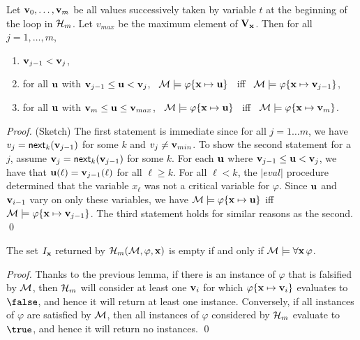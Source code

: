 \documentclass{svjour3}                     %
\begin{document}
\begin{lem}
Let $\mathbf{v}_0, \ldots, \mathbf{v}_m$ be all values successively taken
by variable $t$ at the beginning of the loop in $\mathcal{H}_{m}$.
Let $v_{max}$ be the maximum element of $\mathbf{V}_{\mathbf{x}}$.
Then for all $j=1, \ldots, m$,
\begin{enumerate}
\item
$\mathbf{v}_{j-1} < \mathbf{v}_j$,
\item
for all $\mathbf{u}$ with $\mathbf{v}_{j-1} \leq \mathbf{u} < \mathbf{v}_j$, \ 
$\mathcal{M} \models \varphi\{\mathbf{x} \mapsto \mathbf{u}\}$ \ iff \ 
$\mathcal{M} \models \varphi\{\mathbf{x} \mapsto \mathbf{v}_{j-1}\}$,

\item
for all $\mathbf{u}$ with $\mathbf{v}_m \leq \mathbf{u} \leq \mathbf{v}_{max}$, \ 
$\mathcal{M} \models \varphi\{\mathbf{x} \mapsto \mathbf{u}\}$ \ iff \ 
$\mathcal{M} \models \varphi\{\mathbf{x} \mapsto \mathbf{v}_m\}$.
\end{enumerate}
\end{lem}
\begin{proof}
(Sketch)
The first statement is immediate since for all $j = 1 \ldots m$, we have $v_j = \mathsf{next}_{k}(\mathbf{v}_{j-1})$ for some $k$ and $v_j \neq \mathbf{v}_{min}$.
To show the second statement for a $j$,
assume $\mathbf{v}_j = \mathsf{next}_{k}(\mathbf{v}_{j-1})$ for some $k$.
For each $\mathbf{u}$ where $\mathbf{v}_{j-1} \leq \mathbf{u} < \mathbf{v}_j$,
we have that $\mathbf{u}(\ell) = \mathbf{v}_{j-1}(\ell)$ for all $\ell \geq k$.
For all $\ell \lt k$, the $|eval|$ procedure determined that the variable $x_\ell$ was not a critical variable for $\varphi$.
Since $\mathbf{u}$ and $\mathbf{v}_{i-1}$ vary on only these variables,
we have $\mathcal{M} \models \varphi\{\mathbf{x} \mapsto \mathbf{u}\}$ iff $\mathcal{M} \models \varphi\{\mathbf{x} \mapsto \mathbf{v}_{j-1}\}$.
The third statement holds for similar reasons as the second.
\qed
\end{proof}

\begin{thm}
\label{thm:choose-inst-ge}
The set $I_{\mathbf{x}}$ returned 
by $\mathcal{H}_{m}(\mathcal{M}, \varphi, \mathbf{x})$ is empty if and only if $\mathcal{M} \models \forall \mathbf{x}\, \varphi$.
\end{thm}
\begin{proof}
Thanks to the previous lemma, 
if there is an instance of $\varphi$ that is falsified by $\mathcal{M}$,
then $\mathcal{H}_{m}$ will consider at least one $\mathbf{v}_i$ for which $\varphi \{ \mathbf{x} \mapsto \mathbf{v}_i \}$ evaluates to $\false$,
and hence it will return at least one instance.
Conversely, if all instances of $\varphi$ are satisfied by $\mathcal{M}$, 
then all instances of $\varphi$ considered by $\mathcal{H}_{m}$ evaluate to $\true$,
and hence it will return no instances.
\qed
\end{proof}
\end{document}
